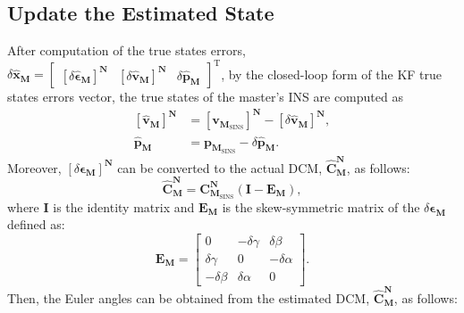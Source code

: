 \documentclass[3p]{elsarticle}
\begin{document}
\subsection{Update the Estimated State}
\noindent After computation of the true states errors, \(\delta \hat{\mathbf{x}}_{\mathbf{M}} = \begin{bmatrix}
	{\left[\delta \hat{\boldsymbol{\epsilon}}_{\mathbf{M}}\right]}^{\mathbf{N}} & {\left[\delta \hat{\mathbf{v}}_{\mathbf{M}}\right]}^{\mathbf{N}} & \delta \hat{\mathbf{p}}_{\mathbf{M}}
\end{bmatrix}^{\mathrm{T}}\), by the closed-loop form of the KF true states errors vector, the true states of the master's INS are computed as
\begin{align}
	\label{eq:kalman_1}
	{\left[\hat{\mathbf{v}}_{\mathbf{M}}\right]}^{\mathbf{N}} &= {\left[{\mathbf{v}}_{{\mathbf{M}}_{\text{SINS}}}\right]}^{\mathbf{N}} - {\left[\delta\hat{\mathbf{v}}_{\mathbf{M}}\right]}^{\mathbf{N}},\\
	\label{eq:kalman_2}
	\hat{\mathbf{p}}_{\mathbf{M}} &= {\mathbf{p}_{{\mathbf{M}}_{\text{SINS}}}}-
	\delta\hat{\mathbf{p}}_{\mathbf{M}}.
\end{align}
Moreover,
\({\left[\delta \boldsymbol{\epsilon}_{\mathbf{M}}\right]}^{\mathbf{N}} \) can be converted to the actual DCM,
\(\mathbf{\hat{C}}_{\mathbf{M}}^{\mathbf{N}}\),
as follows:
\begin{equation}
	\mathbf{\hat{C}}_{\mathbf{M}}^{\mathbf{N}} = \mathbf{C}_{\mathbf{M}_{\text{SINS}}}^{\mathbf{N}}(\mathbf{I}-\mathbf{{E}}_{\mathbf{M}}),
\end{equation}
where
\(\mathbf{I}\) is the identity matrix and %
\(\mathbf{{E}}_{\mathbf{M}}\) is the skew-symmetric matrix of the \(\delta \boldsymbol{\epsilon}_{\mathbf{M}}\)  defined as:
\begin{equation}
	\mathbf{E}_{\mathbf{M}} = \begin{bmatrix}
		0 & -\delta \gamma & \delta \beta \\
		\delta \gamma & 0 & -\delta \alpha \\
		-\delta \beta & \delta \alpha & 0
	\end{bmatrix}.
\end{equation}
 Then, the Euler angles can be obtained from the estimated DCM, \(\hat{\mathbf{C}}_{\mathbf{M}}^{\mathbf{N}}\), as follows:
\end{document}

